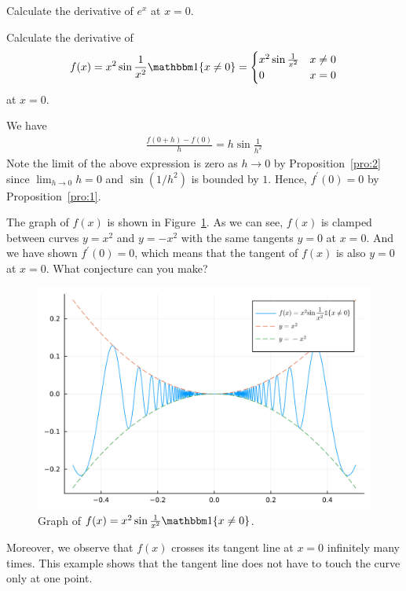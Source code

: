 \documentclass[thmcnt=section, 12pt]{my-elegantbook}
\begin{document}
\begin{exercise}
    Calculate the derivative of $e^x$ at $x = 0$.

    \noindent [Hint: You may use the fact $e^x = \sum_{n=0}^\infty \frac{x^n}{n!} =  1 + x + \frac{1}{2} x^2 + \frac{1}{6} x^3 + \cdots$.]
\end{exercise}

\begin{exercise}
    Calculate the derivative of
    \begin{align*}
        f(x)
        = x^2 \sin \frac{1}{x^2} \ind\{x \neq 0\}
        = \begin{cases}
              x^2 \sin \frac{1}{x^2} & x \neq 0 \\
              0                      & x=0
          \end{cases}
    \end{align*}
    at $x = 0$.
    \label{ex:1}
\end{exercise}

\begin{solution}
    We have
    \begin{align*}
        \frac{f(0+h) - f(0)}{h}
        = h \sin \frac{1}{h^2}
    \end{align*}
    Note the limit of the above expression is zero as $h \to 0$ by Proposition~\ref{pro:2} since $\lim_{h\to 0} h = 0$ and $\sin (1/h^2)$ is bounded by $1$. Hence, $f^\prime(0) = 0$ by Proposition~\ref{pro:1}.

    The graph of $f(x)$ is shown in Figure~\ref{fig:2}. As we can see, $f(x)$ is clamped between curves $y=x^2$ and $y=-x^2$ with the same tangents $y=0$ at $x=0$. And we have shown $f^\prime(0)=0$, which means that the tangent of $f(x)$ is also $y=0$ at $x=0$. What conjecture can you make?

    \begin{figure}[ht]
        \centering
        \includegraphics[scale=0.2]{figures/graph-001.png}
        \caption{Graph of $f(x) = x^2 \sin \frac{1}{x^2} \ind\{x \neq 0\}$.}
        \label{fig:2}
    \end{figure}

    Moreover, we observe that $f(x)$ crosses its tangent line at $x=0$ infinitely many times. This example shows that the tangent line does not have to touch the curve only at one point.
\end{solution}
\end{document}
